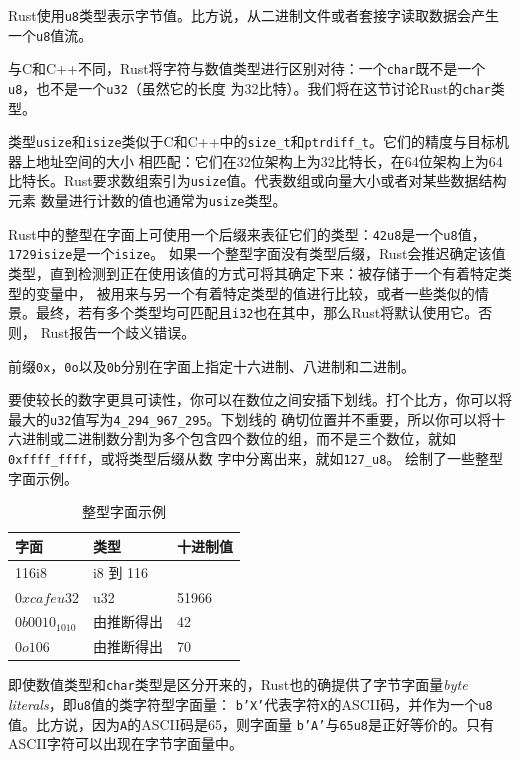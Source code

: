 \smallskip
Rust使用\texttt{u8}类型表示字节值。比方说，从二进制文件或者套接字读取数据会产生一个\texttt{u8}值流。

\medskip
与C和C++不同，Rust将字符与数值类型进行区别对待：一个\texttt{char}既不是一个\texttt{u8}，也不是一个\texttt{u32}（虽然它的长度
为32比特）。我们将在这节讨论Rust的\texttt{char}类型。

\medskip
类型\texttt{usize}和\texttt{isize}类似于C和C++中的\texttt{size\_t}和\texttt{ptrdiff\_t}。它们的精度与目标机器上地址空间的大小
相匹配：它们在32位架构上为32比特长，在64位架构上为64比特长。Rust要求数组索引为\texttt{usize}值。代表数组或向量大小或者对某些数据结构元素
数量进行计数的值也通常为\texttt{usize}类型。

\medskip
Rust中的整型在字面上可使用一个后缀来表征它们的类型：\texttt{42u8}是一个\texttt{u8}值，\texttt{1729isize}是一个\texttt{isize}。
如果一个整型字面没有类型后缀，Rust会推迟确定该值类型，直到检测到正在使用该值的方式可将其确定下来：被存储于一个有着特定类型的变量中，
被用来与另一个有着特定类型的值进行比较，或者一些类似的情景。最终，若有多个类型均可匹配且\texttt{i32}也在其中，那么Rust将默认使用它。否则，
Rust报告一个歧义错误。

\medskip
前缀\texttt{0x}，\texttt{0o}以及\texttt{0b}分别在字面上指定十六进制、八进制和二进制。

\medskip
要使较长的数字更具可读性，你可以在数位之间安插下划线。打个比方，你可以将最大的\texttt{u32}值写为\texttt{4\_294\_967\_295}。下划线的
确切位置并不重要，所以你可以将十六进制或二进制数分割为多个包含四个数位的组，而不是三个数位，就如\texttt{0xffff\_ffff}，或将类型后缀从数
字中分离出来，就如\texttt{127\_u8}。 绘制了一些整型字面示例。

\smallskip
\begin{table}[h]
    \small
    \caption{整型字面示例}\label{TABLE3-5}
    \begin{tabularx}{\linewidth}{X X X}
        \toprule
        \textbf{字面} & \textbf{类型} & \textbf{十进制值} \\
        \midrule
        116i8 & i8 到 116 \\
        $0xcafeu32$ & u32 & 51966 \\
        $0b0010_1010$ & 由推断得出 & 42 \\
        $0o106$ & 由推断得出 & 70 \\
        \bottomrule
    \end{tabularx}
\end{table}

\smallskip
即使数值类型和\texttt{char}类型是区分开来的，Rust也的确提供了字节字面量\textit{byte literals}，即\texttt{u8}值的类字符型字面量：
\texttt{b'X'}代表字符\texttt{X}的ASCII码，并作为一个\texttt{u8}值。比方说，因为\texttt{A}的ASCII码是65，则字面量
\texttt{b'A'}与\texttt{65u8}是正好等价的。只有ASCII字符可以出现在字节字面量中。

